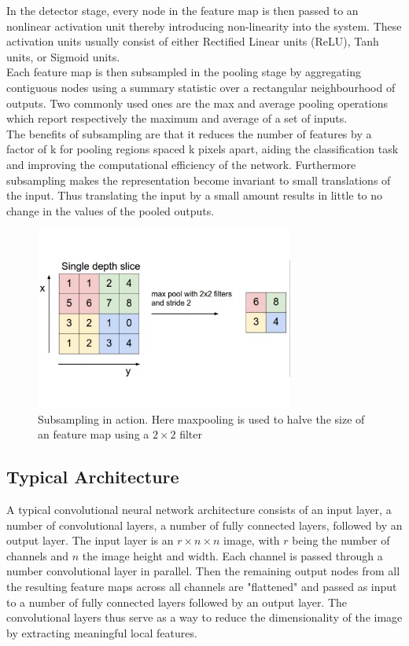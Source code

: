 \noindent In the detector stage, every node in the feature map is then passed to an nonlinear activation unit thereby introducing non-linearity into the system. These activation units usually consist of either Rectified Linear units (ReLU), Tanh units, or Sigmoid units.\\

\noindent Each feature map is then subsampled in the pooling stage by aggregating contiguous nodes using a summary statistic over a rectangular neighbourhood of outputs. Two commonly used ones are the max and average pooling operations which report respectively the maximum and average of a set of inputs.\\

\noindent The benefits of subsampling are that it reduces the number of features by a factor of k for pooling regions spaced k pixels apart, aiding the classification task and improving the computational efficiency of the network. Furthermore subsampling makes the representation become invariant to small translations of the input. Thus translating the input by a small amount results in little to no change in the values of the pooled outputs.\\

\begin{figure}
\centering
\includegraphics[trim=0cm 0cm 0cm 0cm, clip=true, height=60mm]{Chapter2/pooling.pdf}
\caption{Subsampling in action. Here maxpooling is used to halve the size of an feature map using a $2 \times 2$ filter}
\end{figure}

\subsection{Typical Architecture}

\noindent A typical convolutional neural network architecture consists of an input layer, a number of convolutional layers, a number of fully connected layers, followed by an output layer. The input layer is an $r \times n \times n$ image, with $r$ being the number of channels and $n$ the image height and width. Each channel is passed through a number convolutional layer in parallel. Then the remaining output nodes from all the resulting feature maps across all channels are "flattened" and passed as input to a number of fully connected layers followed by an output layer. The convolutional layers thus serve as a way to reduce the dimensionality of the image by extracting meaningful local features.

